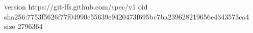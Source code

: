 version https://git-lfs.github.com/spec/v1
oid sha256:7753f5626f77f04990c55639e9420473f695bc7ba239628219656e4343573ca4
size 2796364
